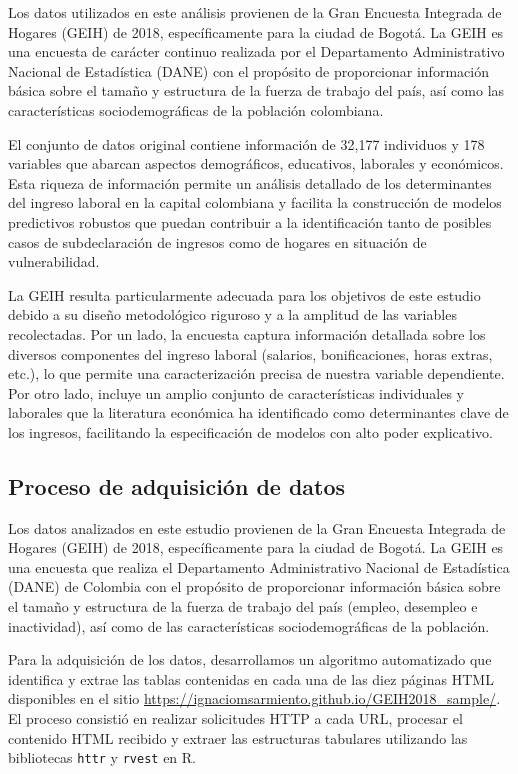\documentclass[12pt,a4paper,onecolumn]{article}
\begin{document}
Los datos utilizados en este análisis provienen de la Gran Encuesta Integrada de Hogares (GEIH) de 2018, específicamente para la ciudad de Bogotá. La GEIH es una encuesta de carácter continuo realizada por el Departamento Administrativo Nacional de Estadística (DANE) con el propósito de proporcionar información básica sobre el tamaño y estructura de la fuerza de trabajo del país, así como las características sociodemográficas de la población colombiana.

El conjunto de datos original contiene información de 32,177 individuos y 178 variables que abarcan aspectos demográficos, educativos, laborales y económicos. Esta riqueza de información permite un análisis detallado de los determinantes del ingreso laboral en la capital colombiana y facilita la construcción de modelos predictivos robustos que puedan contribuir a la identificación tanto de posibles casos de subdeclaración de ingresos como de hogares en situación de vulnerabilidad.

La GEIH resulta particularmente adecuada para los objetivos de este estudio debido a su diseño metodológico riguroso y a la amplitud de las variables recolectadas. Por un lado, la encuesta captura información detallada sobre los diversos componentes del ingreso laboral (salarios, bonificaciones, horas extras, etc.), lo que permite una caracterización precisa de nuestra variable dependiente. Por otro lado, incluye un amplio conjunto de características individuales y laborales que la literatura económica ha identificado como determinantes clave de los ingresos, facilitando la especificación de modelos con alto poder explicativo.

\subsection{Proceso de adquisición de datos}

Los datos analizados en este estudio provienen de la Gran Encuesta Integrada de Hogares (GEIH) de 2018, específicamente para la ciudad de Bogotá. La GEIH es una encuesta que realiza el Departamento Administrativo Nacional de Estadística (DANE) de Colombia con el propósito de proporcionar información básica sobre el tamaño y estructura de la fuerza de trabajo del país (empleo, desempleo e inactividad), así como de las características sociodemográficas de la población.

Para la adquisición de los datos, desarrollamos un algoritmo automatizado que identifica y extrae las tablas contenidas en cada una de las diez páginas HTML disponibles en el sitio \url{https://ignaciomsarmiento.github.io/GEIH2018_sample/}. El proceso consistió en realizar solicitudes HTTP a cada URL, procesar el contenido HTML recibido y extraer las estructuras tabulares utilizando las bibliotecas \texttt{httr} y \texttt{rvest} en R.
\end{document}

